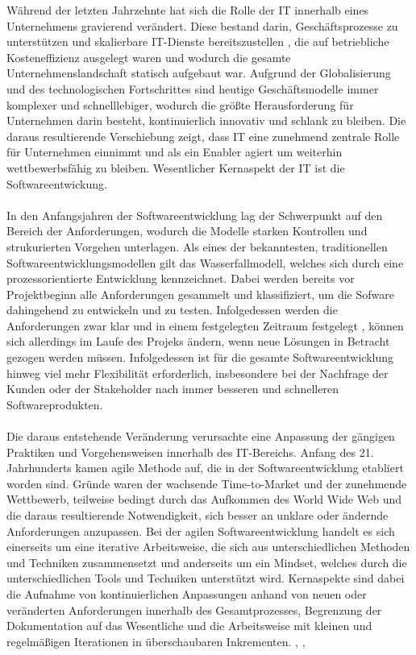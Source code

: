 Während der letzten Jahrzehnte hat sich die Rolle der IT innerhalb eines Unternehmens gravierend verändert. Diese bestand darin, Geschäftsprozesse zu unterstützen und skalierbare IT-Dienste bereitszustellen \cite{haffke_transformative_2017}, die auf betriebliche Kosteneffizienz ausgelegt waren und wodurch die gesamte Unternehmenslandschaft statisch aufgebaut war. \cite[S. 16]{ravichandran_devops_2016} Aufgrund der Globalisierung und des technologischen Fortschrittes sind heutige Geschäftsmodelle immer komplexer und schnelllebiger, wodurch die größte Herausforderung für Unternehmen darin besteht, kontinuierlich innovativ und schlank zu bleiben. \cite{haffke_transformative_2017} Die daraus resultierende Verschiebung zeigt, dass IT eine zunehmend zentrale Rolle für Unternehmen einnimmt und als ein Enabler agiert um weiterhin wettbewerbsfähig zu bleiben. \cite{haffke_transformative_2017} Wesentlicher Kernaspekt der IT ist die Softwareentwickung.\\\\ In den Anfangsjahren der Softwareentwicklung lag der Schwerpunkt auf den Bereich der Anforderungen, wodurch die Modelle starken Kontrollen und strukurierten Vorgehen unterlagen. \cite{kneuper_sixty_2017} Als eines der bekanntesten, traditionellen Softwareentwicklungsmodellen gilt das Wasserfallmodell, welches sich durch eine prozessorientierte Entwicklung kennzeichnet. \cite{bakaji_waterfall_2012} Dabei werden bereits vor Projektbeginn alle Anforderungen gesammelt und klassifiziert, um die Sofware dahingehend zu entwickeln und zu testen. Infolgedessen werden die Anforderungen zwar klar und in einem festgelegten Zeitraum festgelegt \cite{bakaji_waterfall_2012}, können sich allerdings im Laufe des Projeks ändern, wenn neue Lösungen in Betracht gezogen werden müssen. Infolgedessen ist für die gesamte Softwareentwicklung hinweg viel mehr Flexibilität erforderlich, insbesondere bei der Nachfrage der Kunden oder der Stakeholder nach immer besseren und schnelleren Softwareprodukten. \cite[S. 17]{ravichandran_devops_2016} \\\\ Die daraus entstehende Veränderung verursachte eine Anpassung der gängigen Praktiken und Vorgehensweisen innerhalb des IT-Bereichs. Anfang des 21. Jahrhunderts kamen agile Methode auf, die in der Softwareentwicklung etabliert worden sind. Gründe waren der wachsende Time-to-Market und der zunehmende Wettbewerb, teilweise bedingt durch das Aufkommen des World Wide Web und die daraus resultierende Notwendigkeit, sich besser an unklare oder ändernde Anforderungen anzupassen. \cite{haffke_transformative_2017} Bei der agilen Softwareentwicklung handelt es sich einerseits um eine iterative Arbeitsweise, die sich aus unterschiedlichen Methoden und Techniken zusammensetzt und anderseits um ein Mindset, welches durch die unterschiedlichen Tools und Techniken unterstützt wird. Kernaspekte sind dabei die Aufnahme von kontinuierlichen Anpassungen anhand von neuen oder veränderten Anforderungen innerhalb des Gesamtprozesses, Begrenzung der Dokumentation auf das Wesentliche und die Arbeitsweise mit kleinen und regelmäßigen Iterationen in überschaubaren Inkrementen. \cite{cohen_introduction_2004}, \cite{bakaji_waterfall_2012}, 